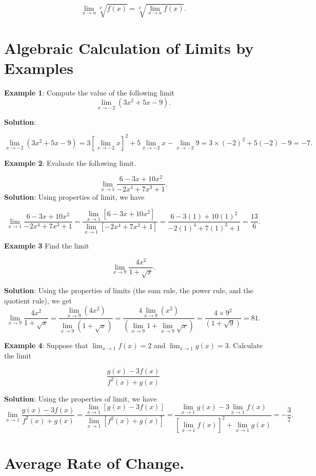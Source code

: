 \documentclass[
]{book}
\begin{document}
\[
\lim_{x\to a}\sqrt[p]{f(x)} = \sqrt[p]{\lim_{x\to a}f(x)}.
\]

\hypertarget{algebraic-calculation-of-limits-by-examples-1}{%
\section{Algebraic Calculation of Limits by Examples}\label{algebraic-calculation-of-limits-by-examples-1}}

\textbf{Example 1}: Compute the value of the following limit
\[
\lim_{x\to -2}(3x^2 + 5x -9).
\]

\textbf{Solution}:

\[
\lim_{x\to -2}(3x^2 + 5x -9) = 3[\lim_{x\to -2} x]^2 + 5\lim_{x\to -2}x - \lim_{x\to -2}9 = 3\times (-2)^2 + 5(-2) - 9 = -7.
\]

\textbf{Example 2}: Evaluate the following limit.

\[
\lim_{x\to 1}\frac{6-3x+10x^2}{-2x^4+7x^3+1}.
\]
\textbf{Solution}: Using properties of limit, we have

\[
\lim_{x\to 1}\frac{6-3x+10x^2}{-2x^4+7x^3+1}=\frac{\lim_{x\to 1}[6-3x+10x^2]}{\lim_{x\to 1}[-2x^4+7x^3+1]}=\frac{6-3(1)+10(1)^2}{-2(1)^4+7(1)^3+1}=\frac{13}{6}.
\]

\textbf{Example 3} Find the limit

\[
\lim_{x\to 9}\frac{4x^2}{1+\sqrt{x}}.
\]

\textbf{Solution}: Using the properties of limits (the sum rule, the power rule, and the quotient rule), we get \[
\lim_{x\to 9}\frac{4x^2}{1+\sqrt{x}}=\frac{\lim_{x\to 9}(4x^2)}{\lim_{x\to 9}(1+\sqrt{x})} = \frac{4\lim_{x\to 9}(x^2)}{(\lim_{x\to 9}1+\lim_{x\to 9}\sqrt{x})} = \frac{4\times 9^2}{(1+\sqrt{9})} = 81.
\]

\textbf{Example 4}: Suppose that \(\lim_{x\to 1}f(x) = 2\) and \(\lim_{x \to 1}g(x) = 3\). Calculate the limit

\[
 \frac{g(x) - 3f(x)}{f^2(x) + g(x)}
 \]

\textbf{Solution}: Using the properties of limit, we have
\[
\lim_{x\to 1} \frac{g(x) - 3f(x)}{f^2(x) + g(x)} =  \frac{\lim_{x\to 1}[g(x) - 3f(x)]}{\lim_{x\to 1}[f^2(x) + g(x)]} = \frac{\lim_{x\to 1}g(x) - 3\lim_{x\to 1}f(x)}{[\lim_{x\to 1}f(x)]^2 + \lim_{x\to 1}g(x)} = -\frac{3}{7}.
\]

\hypertarget{average-rate-of-change.-1}{%
\section{Average Rate of Change.}\label{average-rate-of-change.-1}}
\end{document}
